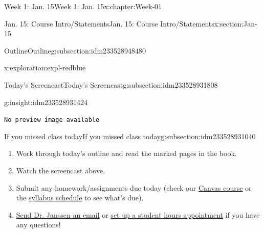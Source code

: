 \documentclass[oneside,10pt,]{book}
\newcommand{\mono}[1]{\texttt{#1}}
\numberwithin{equation}{section}
\newlength{\qrsize}
\newlength{\previewwidth}
\begin{document}
\begin{chapterptx}{Week 1: Jan. 15}{}{Week 1: Jan. 15}{}{}{x:chapter:Week-01}
\begin{sectionptx}{Jan. 15: Course Intro\slash{}Statements}{}{Jan. 15: Course Intro\slash{}Statements}{}{}{x:section:Jan-15}
\begin{subsectionptx}{Outline}{}{Outline}{}{}{g:subsection:idm233528948480}
\begin{exploration}{}{x:exploration:expl-redblue}
\end{exploration}%
\end{subsectionptx}
%
%
\typeout{************************************************}
\typeout{************************************************}
%
\begin{subsectionptx}{Today's Screencast}{}{Today's Screencast}{}{}{g:subsection:idm233528931808}
\begin{insight}{}{g:insight:idm233528931424}%
\setlength{\qrsize}{9em}
\setlength{\previewwidth}{\linewidth}
\addtolength{\previewwidth}{-\qrsize}
\begin{tcbraster}[raster columns=2, raster column skip=1pt, raster halign=center, raster force size=false, raster left skip=0pt, raster right skip=0pt]%
\begin{tcolorbox}[previewstyle, width=\previewwidth]%
\mono{No preview image available}%
\end{tcolorbox}%
\begin{tcolorbox}[qrstyle]%
[QR LINK]\end{tcolorbox}%
\end{tcbraster}%
\end{insight}
\end{subsectionptx}
%
%
\typeout{************************************************}
\typeout{************************************************}
%
\begin{subsectionptx}{If you missed class today}{}{If you missed class today}{}{}{g:subsection:idm233528931040}
%
\begin{enumerate}
\item{}Work through today's outline and read the marked pages in the book.%
\item{}Watch the screencast above.%
\item{}Submit any homework\slash{}assignments due today (check our \href{https://dordt.instructure.com/courses/3110050}{Canvas course} or the \href{https://prof.mkjanssen.org/ds/index.html\#schedule}{syllabus schedule} to see what's due).%
\item{}\href{mailto:mike.janssen@dordt.edu}{Send Dr. Janssen an email} or \href{https://calendly.com/mkjanssen/student-hours}{set up a student hours appointment} if you have any questions!%
\end{enumerate}
\end{subsectionptx}
\end{sectionptx}
\end{chapterptx}
\end{document}
